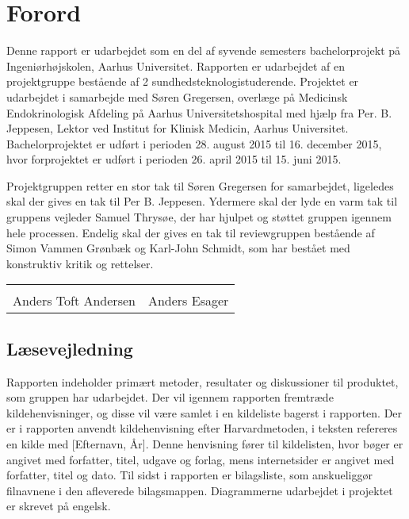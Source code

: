 \chapter*{Forord}

Denne rapport er udarbejdet som en del af syvende semesters bachelorprojekt på Ingeniørhøjskolen, Aarhus Universitet. Rapporten er udarbejdet af en projektgruppe bestående af 2 sundhedsteknologistuderende. Projektet er udarbejdet i samarbejde med Søren Gregersen, overlæge på Medicinsk Endokrinologisk Afdeling på Aarhus Universitetshospital med hjælp fra Per. B. Jeppesen, Lektor ved Institut for Klinisk Medicin, Aarhus Universitet. Bachelorprojektet er udført i perioden 28. august 2015 til 16. december 2015, hvor forprojektet er udført i perioden 26. april 2015 til 15. juni 2015.  

Projektgruppen retter en stor tak til Søren Gregersen for samarbejdet, ligeledes skal der gives en tak til Per B. Jeppesen. Ydermere skal der lyde en varm tak til gruppens vejleder Samuel Thrysøe, der har hjulpet og støttet gruppen igennem hele processen. Endelig skal der gives en tak til reviewgruppen bestående af Simon Vammen Grønbæk og Karl-John Schmidt, som har bestået med konstruktiv kritik og rettelser. 






\phantom{Luft}

\phantom{Luft}

\begin{table}[H]
	\centering
		\begin{tabular}{c c}
			\underline{\phantom{mmmmmmmmmmmmmm}} & \underline{\phantom{mmmmmmmmmmmmmm}}  \\
			Anders Toft Andersen			& Anders Esager		 			\\ 										\end{tabular}
\end{table}

\section*{Læsevejledning}
Rapporten indeholder primært metoder, resultater og diskussioner til produktet, som gruppen har udarbejdet. Der vil igennem rapporten fremtræde kildehenvisninger, og disse vil være samlet i en kildeliste bagerst i rapporten. Der er i rapporten anvendt kildehenvisning efter Harvardmetoden, i teksten refereres en kilde med [Efternavn, År]. Denne henvisning fører til kildelisten, hvor bøger er angivet med forfatter, titel, udgave og forlag, mens internetsider er angivet med forfatter, titel og dato. Til sidst i rapporten er bilagsliste, som anskueliggør filnavnene i den afleverede bilagsmappen. Diagrammerne udarbejdet i projektet er skrevet på engelsk. 

